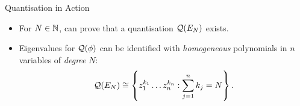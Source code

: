 \begin{frame}{Quantisation in Action}

    \begin{itemize}
        \item For $N \in \mathbb{N}$, can prove that a quantisation $\mathcal{Q}(E_{N})$ exists.
        \item Eigenvalues for $\mathcal{Q}(\phi)$ can be identified with \emph{homogeneous} polynomials in $n$ variables of \emph{degree} $N$:
        $$ \mathcal{Q}(E_{N}) \cong \left\{ z_{1}^{k_{1}}\ldots z_{n}^{k_{n}} : \sum_{j = 1}^{n} k_{j} = N \right\}. $$
    \end{itemize}

\end{frame}